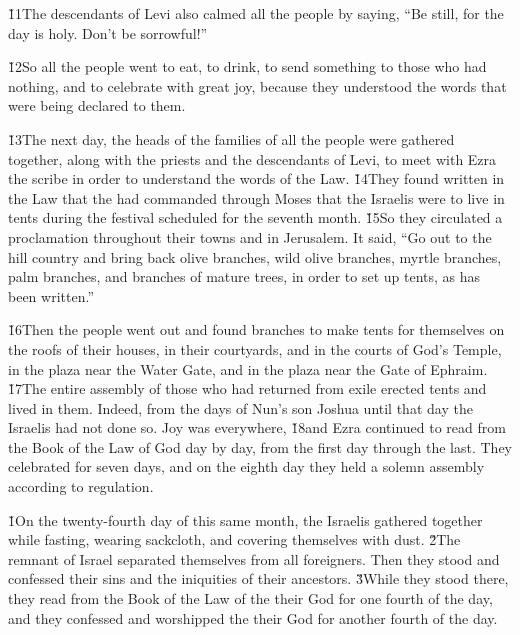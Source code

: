 \v{11}The descendants of Levi also calmed all the people by saying, ``Be still, for the day is holy. Don't be sorrowful!''

\v{12}So all the people went to eat, to drink, to send something to those who had nothing, and to celebrate with great joy, because they understood the words that were being declared to them.

\v{13}The next day, the heads of the families of all the people were gathered together, along with the priests and the descendants of Levi, to meet with Ezra the scribe in order to understand the words of the Law. \v{14}They found written in the Law that the  had commanded through Moses that the Israelis were to live in tents during the festival scheduled for the seventh month. \v{15}So they circulated a proclamation throughout their towns and in Jerusalem. It said, ``Go out to the hill country and bring back olive branches, wild olive branches, myrtle branches, palm branches, and branches of mature trees, in order to set up tents, as has been written.''

\v{16}Then the people went out and found branches to make tents for themselves on the roofs of their houses, in their courtyards, and in the courts of God's Temple, in the plaza near the Water Gate, and in the plaza near the Gate of Ephraim. \v{17}The entire assembly of those who had returned from exile erected tents and lived in them. Indeed, from the days of Nun's son Joshua until that day the Israelis had not done so. Joy was everywhere, \v{18}and Ezra continued to read from the Book of the Law of God day by day, from the first day through the last. They celebrated for seven days, and on the eighth day they held a solemn assembly according to regulation.

\v{1}On the twenty-fourth day of this same month, the Israelis gathered together while fasting, wearing sackcloth, and covering themselves with dust. \v{2}The remnant of Israel separated themselves from all foreigners. Then they stood and confessed their sins and the iniquities of their ancestors. \v{3}While they stood there, they read from the Book of the Law of the  their God for one fourth of the day, and they confessed and worshipped the  their God for another fourth of the day.

